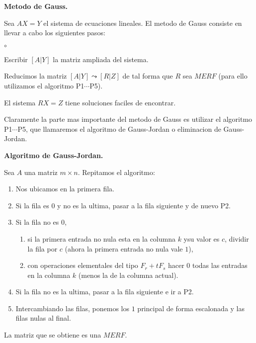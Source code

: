 \documentclass{article}
\theoremstyle{definition}
\theoremstyle{definition}
\theoremstyle{remark}
\begin{document}
\begin{center}
\textbf{Metodo de Gauss.}
\end{center}
Sea $AX=Y$ el sistema de ecuaciones lineales. El metodo de Gauss consiste en llevar a cabo los siguientes pasos:
\begin{list}{$\circ$}{}  
\item Escribir $[A|Y]$ la matriz ampliada del sistema. 
\item Reducimos la matriz $[A|Y] \leadsto [R|Z]$ de tal forma que $R$ sea $MERF$ (para ello utilizamos el algoritmo P1$\cdots$P5).
\item El sistema $RX=Z$ tiene soluciones faciles de encontrar.
\end{list}
Claramente la parte mas importante del metodo de Gauss es utilizar el algoritmo P1$\cdots$P5, que llamaremos el algoritmo de Gauss-Jordan o eliminacion de Gauss-Jordan.
\begin{center}
\textbf{Algoritmo de Gauss-Jordan.}
\end{center}
Sea $A$ una matriz $m \times n$. Repitamos el algoritmo: 
\begin{enumerate}[label=\textcolor{azulp2}{P\arabic*.}]
    \item Nos ubicamos en la primera fila. 
    \item Si la fila es $0$ y no es la ultima, pasar a la fila siguiente y de nuevo \textcolor{azulp2}{P2}.
    \item Si la fila no es $0$, \begin{enumerate}[label=\textcolor{azulp2}{P3.\arabic*}] 
      \item si la primera entrada no nula esta en la columna $k$ ysu valor es $c$, dividir la fila por $c$ (ahora la primera entrada no nula vale $1$),
      \item con operaciones elementales del tipo $F_r+tF_s$ hacer $0$ todas las entradas en la columna $k$ (menos la de la columna actual).
\end{enumerate}
\item Si la fila no es la ultima, pasar a la fila siguiente e ir a \textcolor{azulp2}{P2}. 
\item Intercambiando las filas, ponemos los $1$ principal de forma escalonada y las filas nulas al final.
 \end{enumerate}
La matriz que se obtiene es una $MERF$.
\end{document}
